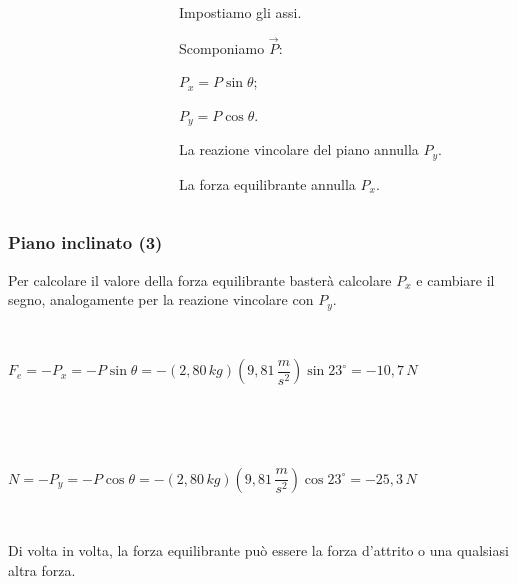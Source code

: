 \documentclass[]{beamer}
\theoremstyle{plain}
\begin{document}
\begin{frame}
\begin{columns}
\begin{column}{0.6\textwidth}
\begin{figure}
\end{figure}

\end{column}
\begin{column}{0.4\textwidth}
{\footnotesize 

\begin{enumerate}\pause
  \item Impostiamo gli assi.\pause
  \item Scomponiamo $ \vec{P} $:\vspace{-.6cm}
\begin{center}
    \item $ P_x = P \sin\theta $;
  \item $ P_y = P \cos\theta $.
  \end{center}
\pause
  \item La reazione vincolare del piano annulla $ P_y $.\pause
  \item La forza equilibrante annulla $ P_x $.
\end{enumerate}
}
\end{column}
\end{columns}

\end{frame}

\begin{frame}
\frametitle{Piano inclinato (3)}
Per calcolare il valore della forza equilibrante basterà calcolare $ P_x $ e cambiare il segno, analogamente per la reazione vincolare con $ P_y $.\pause

~

\begin{center}
$ F_e = - P_x = - P \sin\theta = - (2,80 \, kg) \left( 9,81 \, \dfrac{m}{s^2} \right) \sin 23^\circ = - 10,7 \, N $ \pause

~

~

$ N = - P_y = - P \cos\theta = - (2,80 \, kg) \left( 9,81 \, \dfrac{m}{s^2} \right) \cos 23^\circ = - 25,3 \, N $
\end{center}\pause

~

Di volta in volta, la forza equilibrante può essere la forza d'attrito o una qualsiasi altra forza.
\end{frame}
\end{document}
